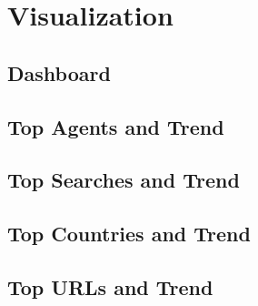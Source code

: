 \section{Visualization}

\subsection{Dashboard}

\subsection{Top Agents and Trend}

\subsection{Top Searches and Trend}

\subsection{Top Countries and Trend}

\subsection{Top URLs and Trend}

